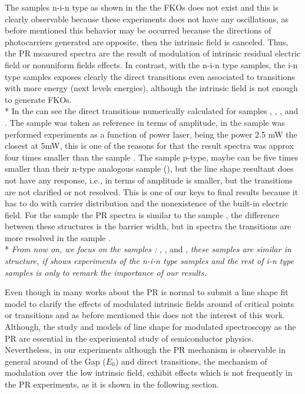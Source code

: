 The samples n-i-n type as shown in the  the FKOs does not exist and this is clearly observable because these experiments does not have any oscillations, as before mentioned this behavior may be occurred because the directions  of photocarriers generated are opposite, then the intrinsic field is canceled. Thus, the PR measured spectra are the result of modulation of intrinsic residual electric field or  nonuniform fields effects\cite{delsole1978effect}.  
In contrast,  with the n-i-n type samples, the i-n type samples exposes clearly the direct transitions even associated to transitions with more energy (next levels energies), although the intrinsic field is not enough to generate FKOs. \\*
In the  can see the direct transitions numerically calculated for samples , , ,  and . The sample  was taken as reference in terms of amplitude, in the sample  was performed experiments as a function of power laser, being the power 2.5 mW the closest at 5mW, this is one of the reasons for that the result spectra was approx four times smaller than the sample .   The sample  p-type, maybe can be five times smaller than their n-type analogous sample (), but the line shape resultant does not have any response, i.e., in terms of amplitude is smaller, but the transitions are not clarified or not resolved. This is one of our keys to final results because it has to do with carrier distribution and the nonexistence of the built-in electric field. For the sample  the PR spectra is similar to the sample  , the difference between these structures is the barrier width, but in spectra the transitions are more resolved in the sample .  \\*
\emph{From now on, we focus on the samples :} , ,  and , \emph{these samples are similar in structure, if shows experiments of the n-i-n type samples and the rest of i-n type samples is only to remark the importance of our results. }

Even though in many works about the PR is normal to submit a line shape fit model  to clarify the effects of modulated intrinsic fields around of critical points or transitions and as before mentioned this does not the interest of this work. Although, the study and models of line shape for modulated spectroscopy as the PR are essential in the experimental study of semiconductor physics\cite{cardona1969modulation,seraphin1966bandstructure}.  Nevertheless, in our experiments  although the PR mechanism is observable in general around of the Gap ($E_0$) and direct transitions, the mechanism of modulation over the low intrinsic field, exhibit  effects  which is not frequently in the PR experiments, as it is shown in the following section. 


